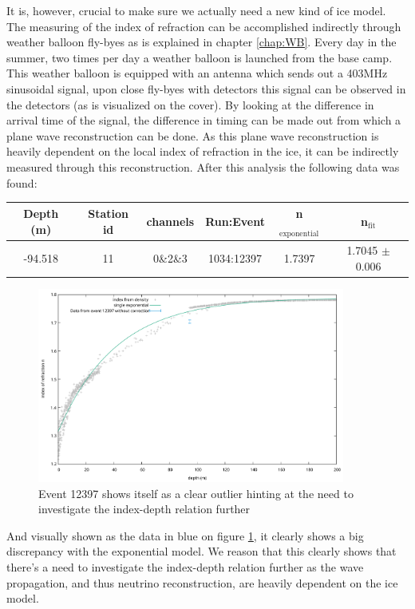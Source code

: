 \newpage
It is, however, crucial to make sure we actually need a new kind of ice model.
The measuring of the index of refraction can be accomplished indirectly through
weather balloon fly-byes as is explained in chapter \ref{chap:WB}. Every day in
the summer, two times per day a weather balloon is launched from the base camp.
This weather balloon is equipped with an antenna which sends out a 403MHz
sinusoidal signal, upon close fly-byes with detectors this signal can be
observed in the detectors (as is visualized on the cover). By looking at the
difference in arrival time of the signal, the difference in timing can be made
out from which a plane wave reconstruction can be done. As this plane wave
reconstruction is heavily dependent on the local index of refraction in the
ice, it can be indirectly measured through this reconstruction.  After this
analysis the following data was found:
\begin{center}
\begin{tabular}{||c c c c c c||}
 \hline
 Depth (m) & Station id & channels & Run:Event & n$_\text{exponential}$ & n$_\text{fit}$\\ [0.5ex]
 \hline\hline
 -94.518 & 11 & 0\&2\&3 & 1034:12397 & 1.7397 & 1.7045 $\pm$ 0.006 \\
 \hline
\end{tabular}
\end{center}
\begin{figure}
	\centering
	\includegraphics[width=0.9\textwidth]{figures/Event12397NoCorr.pdf}
  \caption{Event 12397 shows itself as a clear outlier hinting at the need to investigate the index-depth relation further}
  \label{fig:SumFinRes}
\end{figure}
And visually shown as the data in blue on figure \ref{fig:SumFinRes}, 
it clearly shows a big discrepancy with the exponential model.
We reason that this clearly shows that there's a need to investigate
the index-depth relation further as the wave propagation, and thus
neutrino reconstruction, are heavily dependent on the ice model.
\newpage
